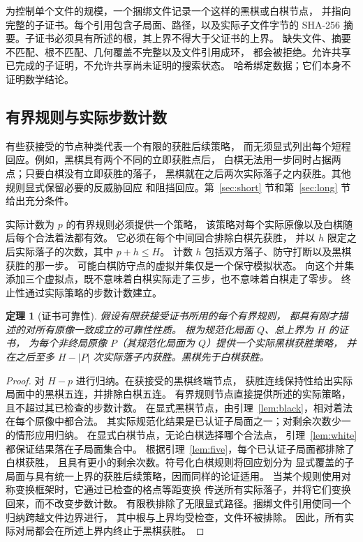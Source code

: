 \documentclass[11pt]{article}
\newtheorem{theorem}{定理}[section]
\theoremstyle{definition}
\theoremstyle{remark}
\begin{document}
为控制单个文件的规模，一个捆绑文件记录一个这样的黑棋或白棋节点，
并指向完整的子证书。每个引用包含子局面、路径，以及实际子文件字节的
SHA-256 摘要。子证书必须具有所述的根，其上界不得大于父证书的上界。
缺失文件、摘要不匹配、根不匹配、几何覆盖不完整以及文件引用成环，
都会被拒绝。允许共享已完成的子证明，不允许共享尚未证明的搜索状态。
哈希绑定数据；它们本身不证明数学结论。

\subsection{有界规则与实际步数计数}
有些获接受的节点种类代表一个有限的获胜后续策略，
而无须显式列出每个短程回应。例如，黑棋具有两个不同的立即获胜点后，
白棋无法用一步同时占据两点；只要白棋没有立即获胜的落子，
黑棋就在之后两次实际落子之内获胜。其他规则显式保留必要的反威胁回应
和阻挡回应。第~\ref{sec:short} 节和第~\ref{sec:long} 节给出充分条件。

实际计数为 $p$ 的有界规则必须提供一个策略，
该策略对每个实际原像以及白棋随后每个合法着法都有效。
它必须在每个中间回合排除白棋先获胜，
并以 $h$ 限定之后实际落子的次数，其中 $p+h\leq H$。
计数 $h$ 包括双方落子、防守打断以及黑棋获胜的那一步。
可能白棋防守点的虚拟并集仅是一个保守模拟状态。
向这个并集添加三个虚拟点，既不意味着白棋实际走了三步，也不意味着白棋走了零步。
终止性通过实际策略的步数计数建立。

\begin{theorem}[证书可靠性]
\label{thm:sound}
假设有限获接受证书所用的每个有界规则，
都具有刚才描述的对所有原像一致成立的可靠性性质。
根为规范化局面 $Q$、总上界为 $H$ 的证书，
为每个非终局原像 $P$（其规范化局面为 $Q$）提供一个实际黑棋获胜策略，
并在之后至多 $H-|P|$ 次实际落子内获胜。黑棋先于白棋获胜。
\end{theorem}
\begin{proof}
对 $H-p$ 进行归纳。在获接受的黑棋终端节点，
获胜连线保持性给出实际局面中的黑棋五连，并排除白棋五连。
有界规则节点直接提供所述的实际策略，且不超过其已检查的步数计数。
在显式黑棋节点，由引理~\ref{lem:black}，相对着法在每个原像中都合法。
其实际规范化结果是已认证子局面之一；对剩余次数少一的情形应用归纳。
在显式白棋节点，无论白棋选择哪个合法点，
引理~\ref{lem:white} 都保证结果落在子局面集合中。
根据引理~\ref{lem:five}，每个已认证子局面都排除了白棋获胜，
且具有更小的剩余次数。符号化白棋规则将回应划分为
显式覆盖的子局面与具有统一上界的获胜后续策略，因而同样的论证适用。
当某个规则使用对称变换框架时，它通过已检查的格点等距变换
传送所有实际落子，并将它们变换回来，而不改变步数计数。
有限秩排除了无限显式路径。捆绑文件引用使同一个归纳跨越文件边界进行，
其中根与上界均受检查，文件环被排除。
因此，所有实际对局都会在所述上界内终止于黑棋获胜。
\end{proof}
\end{document}
